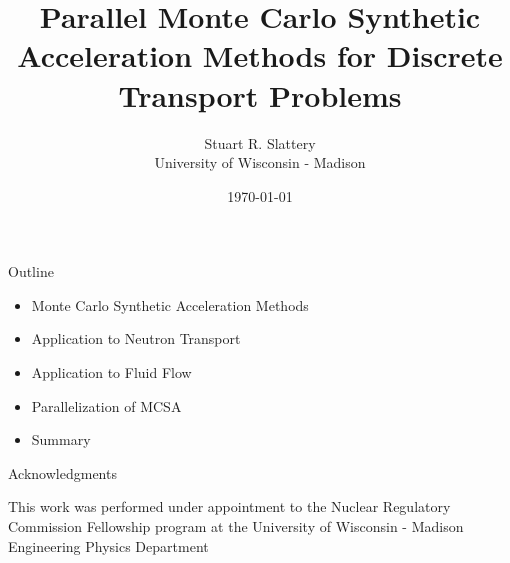 \documentclass{beamer}
\author{Stuart R. Slattery\\ University of Wisconsin - Madison}
\date{\today}
\title{Parallel Monte Carlo Synthetic Acceleration Methods for
  Discrete Transport Problems}
\begin{document}
\maketitle

\begin{frame}{Outline}

  \begin{itemize}
  \item Monte Carlo Synthetic Acceleration Methods
    \bigskip
  \item Application to Neutron Transport
    \bigskip
  \item Application to Fluid Flow
    \bigskip
  \item Parallelization of MCSA
    \bigskip
  \item Summary
  \end{itemize}

\end{frame}

\begin{frame}{Acknowledgments}

  This work was performed under appointment to the Nuclear Regulatory
  Commission Fellowship program at the University of Wisconsin - Madison
  Engineering Physics Department

\end{frame}
\end{document}
